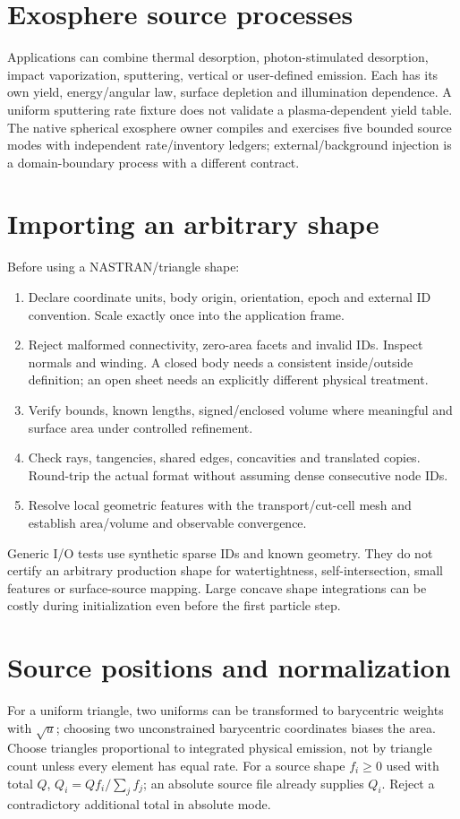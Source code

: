 \section{Exosphere source processes}
Applications can combine thermal desorption, photon-stimulated desorption,
impact vaporization, sputtering, vertical or user-defined emission.
Each has its own yield, energy/angular law, surface depletion and illumination
dependence. A uniform sputtering rate fixture does not validate a
plasma-dependent yield table. The native spherical exosphere owner compiles
and exercises five bounded source modes with independent rate/inventory
ledgers; external/background injection is a domain-boundary process with a
different contract.

\section{Importing an arbitrary shape}
Before using a NASTRAN/triangle shape:
\begin{enumerate}
\item Declare coordinate units, body origin, orientation, epoch and external
ID convention. Scale exactly once into the application frame.
\item Reject malformed connectivity, zero-area facets and invalid IDs.
Inspect normals and winding. A closed body needs a consistent inside/outside
definition; an open sheet needs an explicitly different physical treatment.
\item Verify bounds, known lengths, signed/enclosed volume where meaningful
and surface area under controlled refinement.
\item Check rays, tangencies, shared edges, concavities and translated copies.
Round-trip the actual format without assuming dense consecutive node IDs.
\item Resolve local geometric features with the transport/cut-cell mesh and
establish area/volume and observable convergence.
\end{enumerate}
Generic I/O tests use synthetic sparse IDs and known geometry. They do not
certify an arbitrary production shape for watertightness, self-intersection,
small features or surface-source mapping. Large concave shape integrations
can be costly during initialization even before the first particle step.

\section{Source positions and normalization}
For a uniform triangle, two uniforms can be transformed to barycentric
weights with $\sqrt{u}$; choosing two unconstrained barycentric coordinates
biases the area. Choose triangles proportional to integrated physical
emission, not by triangle count unless every element has equal rate.
For a source shape $f_i\geq0$ used with total $Q$,
$Q_i=Q f_i/\sum_j f_j$; an absolute source file already supplies $Q_i$.
Reject a contradictory additional total in absolute mode.

